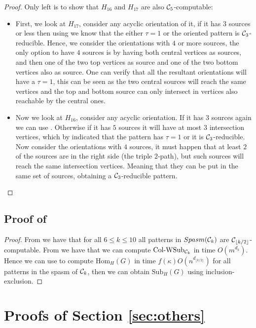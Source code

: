 \documentclass[a4paper,UKenglish,cleveref, autoref, numberwithinsect, thm-restate]{lipics-v2021}
\newcommand{\reducible}[1]{${#1}$-reducible}
\newcommand{\computable}[1]{${#1}$-computable}
\newcommand{\cycle}[1]{\cC_{#1}}
\newcommand{\WSubNI}[1]{\mathrm{\text{Col-WSub}}_{#1}}
\newcommand{\Hom}[2]{\mathrm{Hom}_{#2}(#1)}
\newcommand{\Sub}[2]{\mathrm{Sub}_{#2}(#1)}
\newcommand{\Spasm}{Spasm}
\newcommand{\degen}{\kappa}
\newcommand{\dtw}{\tau}
\newcommand{\cC}{{\cal C}}
\begin{document}
\begin{proof}
		Only left is to show that $H_{16}$ and $H_{17}$ are also \computable{\cycle{5}}:
		
		\begin{itemize}
			\item First, we look at $H_{17}$, consider any acyclic orientation of it, if it has $3$ sources or less then using  we know that the either $\dtw=1$ or the oriented pattern is \reducible{\cycle{3}}. Hence, we consider the orientations with $4$ or more sources, the only option to have $4$ sources is by having both central vertices as sources, and then one of the two top vertices as source and one of the two bottom vertices also as source. One can verify that all the resultant orientations will have a $\dtw=1$, this can be seen as the two central sources will reach the same vertices and the top and bottom source can only intersect in vertices also reachable by the central ones.
			
			\item Now we look at $H_{16}$, consider any acyclic orientation. If it has $3$ sources again we can use . Otherwise if it has $5$ sources it will have at most $3$ intersection vertices, which by  indicated that the pattern has $\dtw=1$ or it is \reducible{\cycle{3}}. Now consider the orientations with $4$ sources, it must happen that at least $2$ of the sources are in the right side (the triple $2$-path), but such sources will reach the same intersection vertices. Meaning that they can be put in the same set of sources, obtaining a \reducible{\cycle{3}} pattern.
		\end{itemize}
	\end{proof}
	
	\subsection{Proof of }
	\uppercycle*
	\begin{proof}
		From  we have that for all $6 \leq k \leq 10$ all patterns in $\Spasm(\cycle{k})$ are \computable{\cycle{\lfloor k/2 \rfloor}}. From  we have that we can compute $\WSubNI{\cycle{k}}$ in time $O(m^{d_k})$. Hence we can use  to compute $\Hom{G}{H}$ in time $f(\degen)O(n^{d_{\lfloor k/2 \rfloor}})$ for all patterns in the spasm of $\cycle{k}$, then we can obtain $\Sub{G}{H}$ using inclusion-exclusion.
	\end{proof}
	
	\section{Proofs of Section \ref{sec:others}}
	
\end{document}
